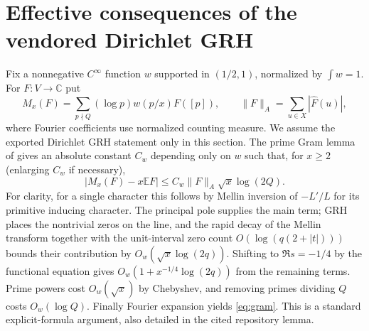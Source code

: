 \documentclass[11pt]{article}
\theoremstyle{remark}\newtheorem{remark}[theorem]{Remark}
\newcommand{\C}{\mathbb C}
\newcommand{\E}{\mathbb E}
\begin{document}
\section{Effective consequences of the vendored Dirichlet GRH}
Fix a nonnegative $C^\infty$ function $w$ supported in $(1/2,1)$, normalized by $\int w=1$. For $F:V\to\C$ put
\[
M_x(F)=\sum_{p\nmid Q}(\log p)w(p/x)F([p]),\qquad
\|F\|_A=\sum_{u\in X}|\widehat F(u)|,
\]
where Fourier coefficients use normalized counting measure. We assume the exported Dirichlet GRH statement only in this section. The prime Gram lemma of \cite[\texttt{rec:lem:gram}]{article} gives an absolute constant $C_w$ depending only on $w$ such that, for $x\ge2$ (enlarging $C_w$ if necessary),
\begin{equation}\label{eq:gram}
|M_x(F)-x\E F|\le C_w\|F\|_A\sqrt{x}\log(2Q).
\end{equation}
For clarity, for a single character this follows by Mellin inversion of $-L'/L$ for its primitive inducing character. The principal pole supplies the main term; GRH places the nontrivial zeros on the line, and the rapid decay of the Mellin transform together with the unit-interval zero count $O(\log(q(2+|t|)))$ bounds their contribution by $O_w(\sqrt{x}\log(2q))$. Shifting to $\Re s=-1/4$ by the functional equation gives $O_w(1+x^{-1/4}\log(2q))$ from the remaining terms. Prime powers cost $O_w(\sqrt{x})$ by Chebyshev, and removing primes dividing $Q$ costs $O_w(\log Q)$. Finally Fourier expansion yields \eqref{eq:gram}. This is a standard explicit-formula argument, also detailed in the cited repository lemma.
\end{document}
